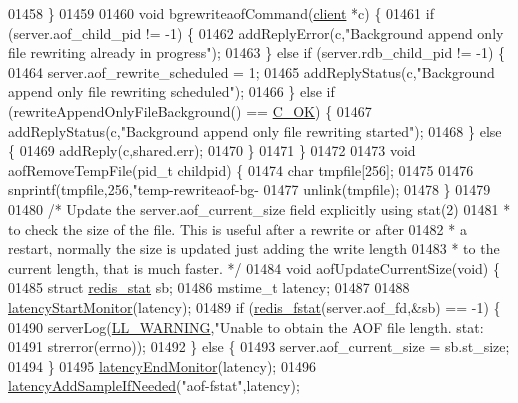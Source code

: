 \begin{DoxyCode}
{{{{{{{{{{{{{{{{{{{{{{{{{{{01458 \}
01459 
01460 \textcolor{keywordtype}{void} bgrewriteaofCommand(\hyperlink{structclient}{client} *c) \{
01461     \textcolor{keywordflow}{if} (server.aof\_child\_pid != -1) \{
01462         addReplyError(c,\textcolor{stringliteral}{"Background append only file rewriting already in progress"});
01463     \} \textcolor{keywordflow}{else} \textcolor{keywordflow}{if} (server.rdb\_child\_pid != -1) \{
01464         server.aof\_rewrite\_scheduled = 1;
01465         addReplyStatus(c,\textcolor{stringliteral}{"Background append only file rewriting scheduled"});
01466     \} \textcolor{keywordflow}{else} \textcolor{keywordflow}{if} (rewriteAppendOnlyFileBackground() == \hyperlink{server_8h_a303769ef1065076e68731584e758d3e1}{C\_OK}) \{
01467         addReplyStatus(c,\textcolor{stringliteral}{"Background append only file rewriting started"});
01468     \} \textcolor{keywordflow}{else} \{
01469         addReply(c,shared.err);
01470     \}
01471 \}
01472 
01473 \textcolor{keywordtype}{void} aofRemoveTempFile(pid\_t childpid) \{
01474     \textcolor{keywordtype}{char} tmpfile[256];
01475 
01476     snprintf(tmpfile,256,\textcolor{stringliteral}{"temp-rewriteaof-bg-%
01477     unlink(tmpfile);
01478 \}
01479 
01480 \textcolor{comment}{/* Update the server.aof\_current\_size field explicitly using stat(2)}
01481 \textcolor{comment}{ * to check the size of the file. This is useful after a rewrite or after}
01482 \textcolor{comment}{ * a restart, normally the size is updated just adding the write length}
01483 \textcolor{comment}{ * to the current length, that is much faster. */}
01484 \textcolor{keywordtype}{void} aofUpdateCurrentSize(\textcolor{keywordtype}{void}) \{
01485     \textcolor{keyword}{struct} \hyperlink{config_8h_ae18037d20ab1bc7c716ea0bcb506f7af}{redis\_stat} sb;
01486     mstime\_t latency;
01487 
01488     \hyperlink{latency_8h_a87d7b5b368dad97457f13466d760b0e1}{latencyStartMonitor}(latency);
01489     \textcolor{keywordflow}{if} (\hyperlink{config_8h_a7fb7329d05a6b4d1b1e7a3fac44c0668}{redis\_fstat}(server.aof\_fd,&sb) == -1) \{
01490         serverLog(\hyperlink{server_8h_a31229b9334bba7d6be2a72970967a14b}{LL\_WARNING},\textcolor{stringliteral}{"Unable to obtain the AOF file length. stat: %
01491             strerror(errno));
01492     \} \textcolor{keywordflow}{else} \{
01493         server.aof\_current\_size = sb.st\_size;
01494     \}
01495     \hyperlink{latency_8h_a88461aee20da0a648fe3332b5f068df7}{latencyEndMonitor}(latency);
01496     \hyperlink{latency_8h_a77922ab34035890c90f98831a9071359}{latencyAddSampleIfNeeded}(\textcolor{stringliteral}{"aof-fstat"},latency);
}}}}}}}}}}}}}}}}}}}}}}}}}}}}}
\end{DoxyCode}
